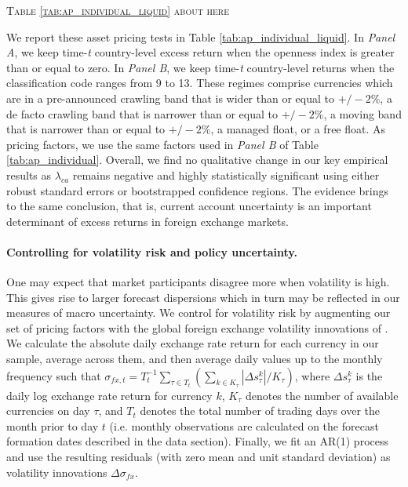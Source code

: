 \begin{center}
	\textsc{Table \ref{tab:ap_individual_liquid} about here}
\end{center}

We report these asset pricing tests in Table \ref{tab:ap_individual_liquid}. In \emph{Panel A}, we keep time-\emph{t} country-level excess return when the openness index is greater than or equal to zero. In \emph{Panel B}, we keep time-\emph{t} country-level returns when the classification code ranges from 9 to 13. These regimes comprise currencies which are in a pre-announced crawling band that is wider than or equal to $+/-2\%$, a de facto crawling band that is narrower than or equal to $+/-2\%$, a moving band that is narrower than or equal to $+/-2\%$, a managed float, or a free float. As pricing factors, we use the same factors used in \emph{Panel B} of Table \ref{tab:ap_individual}. Overall, we find no qualitative change in our key empirical results as $\lambda_{ca}$ remains negative and highly statistically significant using either robust standard errors or bootstrapped confidence regions. The evidence brings to the same conclusion, that is, current account uncertainty is an important determinant of excess returns in foreign exchange markets.

\paragraph{Controlling for volatility risk and policy uncertainty.}
One may expect that market participants disagree more when volatility is high. This gives rise to larger forecast dispersions which in turn may be reflected in our measures of macro uncertainty. We control for volatility risk by augmenting our set of pricing factors with the global foreign exchange volatility innovations of \citet{menkhoff_etal2012}. We calculate the absolute daily exchange rate return for each currency in our sample, average across them, and then average daily values up to the monthly frequency such that $\sigma_{fx,t} = T_{t}^{-1}\sum_{\tau \in T_{t}}(\sum_{k\in K_{\tau}} |\Delta s^{k}_{\tau}|/K_{\tau})$, where $\Delta s^{k}_{\tau}$ is the daily log exchange rate return for currency $k$, $K_{\tau}$ denotes the number of available currencies on day $\tau$, and $T_t$ denotes the total number of trading days over the month prior to day $t$ (i.e. monthly observations are calculated on the forecast formation dates described in the data section). Finally, we fit an AR(1) process and use the resulting residuals (with zero mean and unit standard deviation) as volatility innovations $\Delta \sigma_{fx}$.


